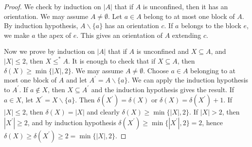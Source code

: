 \documentclass[10pt,a4paper]{article}
\theoremstyle{note}
\begin{document}
\begin{proof}  We check by induction on $|A|$ that if $A$ is unconfined, then it has an orientation.  We may assume $A\neq \emptyset$. Let $a\in A$ belong to at most one block of $A$. By induction hypothesis, $A\smallsetminus \{a\}$ has an orientation $c$. If $a$ belongs to the block $e$, we make $a$ the apex of $e$. This gives an orientation of $A$ extending $c$.

Now we prove by induction on  $|A|$ that if $A$ is unconfined and  $X\subseteq A$, and $|X|\leq 2$, then $X\leq^* A$.  It is enough to check that if $X\subseteq A$, then $\delta(X)\geq \min\{ |X|,2\}$.  We may assume $A\neq\emptyset$. Choose $a\in A$ belonging to at most one block of $A$ and let $A^\prime= A\smallsetminus\{a\}$. We can apply the induction hypothesis to $A^\prime$. If $a\not\in X$, then $X\subseteq A^\prime$ and the induction hypothesis gives the result. If $a\in X$, let  $X^\prime =X\smallsetminus\{a\}$. Then  $\delta(X^\prime)=\delta(X)$ or  $\delta(X)=\delta(X^\prime)+1$.  If $|X|\leq 2$, then $\delta(X)=|X|$ and clearly $\delta(X)\geq \min\{|X|,2\}$.  If $|X|>2$, then %
$|X^\prime| \geq 2$, and by induction hypothesis $\delta(X^\prime) \geq \min \{|X^\prime|,2 \}=2 $, hence $\delta(X) \geq  \delta(X^\prime) \geq 2= \min \{|X|, 2 \} $.
\end{proof}
\end{document}
